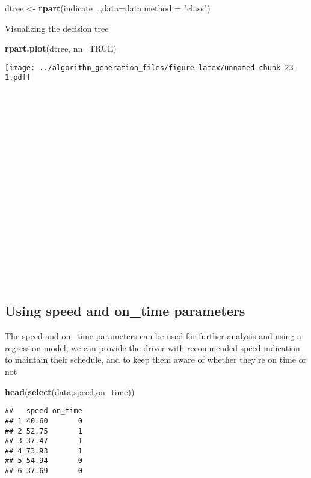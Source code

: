 \documentclass[
]{article}
\newenvironment{Shaded}{\begin{snugshade}}{\end{snugshade}}
\newcommand{\DataTypeTok}[1]{\textcolor[rgb]{0.13,0.29,0.53}{#1}}
\newcommand{\KeywordTok}[1]{\textcolor[rgb]{0.13,0.29,0.53}{\textbf{#1}}}
\newcommand{\NormalTok}[1]{#1}
\newcommand{\OperatorTok}[1]{\textcolor[rgb]{0.81,0.36,0.00}{\textbf{#1}}}
\newcommand{\OtherTok}[1]{\textcolor[rgb]{0.56,0.35,0.01}{#1}}
\newcommand{\StringTok}[1]{\textcolor[rgb]{0.31,0.60,0.02}{#1}}
\begin{document}
\begin{Shaded}
\begin{Highlighting}[]
\NormalTok{dtree <-}\StringTok{ }\KeywordTok{rpart}\NormalTok{(indicate}\OperatorTok{~}\NormalTok{.,}\DataTypeTok{data=}\NormalTok{data,}\DataTypeTok{method =} \StringTok{"class"}\NormalTok{)}
\end{Highlighting}
\end{Shaded}

Visualizing the decision tree

\begin{Shaded}
\begin{Highlighting}[]
\KeywordTok{rpart.plot}\NormalTok{(dtree, }\DataTypeTok{nn=}\OtherTok{TRUE}\NormalTok{)}
\end{Highlighting}
\end{Shaded}

\texttt{[image: ../algorithm\_generation\_files/figure-latex/unnamed-chunk-23-1.pdf]}

~

~

~

~

~

~

~

~

~

~

\hypertarget{using-speed-and-on_time-parameters}{%
\subsection{Using speed and on\_time
parameters}\label{using-speed-and-on_time-parameters}}

The speed and on\_time parameters can be used for further analysis and
using a regression model, we can provide the driver with recommended
speed indication to maintain their schedule, and to keep them aware of
whether they're on time or not

\begin{Shaded}
\begin{Highlighting}[]
\KeywordTok{head}\NormalTok{(}\KeywordTok{select}\NormalTok{(data,speed,on_time))}
\end{Highlighting}
\end{Shaded}

\begin{verbatim}
##   speed on_time
## 1 40.60       0
## 2 52.75       1
## 3 37.47       1
## 4 73.93       1
## 5 54.94       0
## 6 37.69       0
\end{verbatim}
\end{document}

